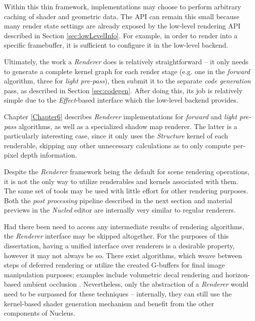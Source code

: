 Within this thin framework, implementations may choose to perform arbitrary caching of shader and geometric data. The API can remain this small because many render state settings are already exposed by the low-level rendering API described in Section \ref{sec:lowLevelInfo}. For example, in order to render into a specific framebuffer, it is sufficient to configure it in the low-level backend.

Ultimately, the work a \emph{Renderer} does is relatively straightforward -- it only needs to generate a complete kernel graph for each render stage (e.g. one in the \emph{forward} algorithm, three for \emph{light pre-pass}), then submit it to the separate \emph{code generation} pass, as described in Section \ref{sec:codegen}. After doing this, its job is relatively simple due to the \emph{Effect}-based interface which the low-level backend provides.

Chapter \ref{Chapter6} describes \emph{Renderer} implementations for \emph{forward} and \emph{light pre-pass} algorithms, as well as a specialized shadow map renderer. The latter is a particularly interesting case, since it only uses the \emph{Structure} kernel of each renderable, skipping any other unnecessary calculations as to only compute per-pixel depth information.

Despite the \emph{Renderer} framework being the default for scene rendering operations, it is not the only way to utilize renderables and kernels associated with them. The same set of tools may be used with little effort for other rendering purposes. Both the \emph{post processing} pipeline described in the next section and material previews in the \emph{Nucled} editor are internally very similar to regular renderers.

Had there been need to access any intermediate results of rendering algorithms, the \emph{Renderer} interface may be skipped altogether. For the purposes of this dissertation, having a unified interface over renderers is a desirable property, however it may not always be so. There exist algorithms, which weave between steps of deferred rendering or utilize the created G-buffers for final image manipulation purposes; examples include volumetric decal rendering \cite{VolumeDecals} and horizon-based ambient occlusion \cite{HBAO}. Nevertheless, only the abstraction of a \emph{Renderer} would need to be surpassed for these techniques -- internally, they can still use the kernel-based shader generation mechanism and benefit from the other components of Nucleus.

